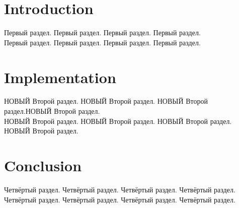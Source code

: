 \documentclass{article}
\begin{document}
\section*{Introduction}
Первый раздел. Первый раздел. Первый раздел. Первый раздел. \\
Первый раздел. Первый раздел. Первый раздел. Первый раздел.

\section*{Implementation}
НОВЫЙ Второй раздел. НОВЫЙ Второй раздел. НОВЫЙ Второй раздел.НОВЫЙ  Второй раздел. \\
НОВЫЙ Второй раздел. НОВЫЙ Второй раздел. НОВЫЙ Второй раздел. НОВЫЙ Второй раздел.

\section*{Conclusion}
Четвёртый раздел. Четвёртый раздел. Четвёртый раздел. Четвёртый раздел. \\
Четвёртый раздел. Четвёртый раздел. Четвёртый раздел. Четвёртый раздел.
\end{document}
